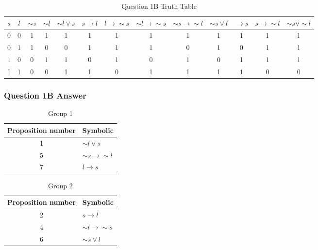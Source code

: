 \documentclass[12pt,a4paper]{article}
\begin{document}
\newpage
\begin{landscape}
\thispagestyle{fancylscape}
\begin{table}[h]
\centering
\caption{Question 1B Truth Table}
\begin{tabular}{c|c|c|c|c|c|c|c|c|c|c|c|c}
$s$ & $l$ & $\sim{s}$ & $\sim{l}$ & $\sim{l} \vee s$ & $s \rightarrow l$ & $l \rightarrow \sim{s}$ & $\sim{l} \rightarrow \sim{s}$ & $\sim{s} \rightarrow \sim{l}$ & $\sim{s} \vee l$ & $ \rightarrow s$ & $s \rightarrow \sim{l}$ & $\sim{s} \vee \sim{l}$ \\
\hline
0 & 0 & 1 & 1 & 1 & 1 & 1 & 1 & 1 & 1 & 1 & 1 & 1 \\
\hline
0 & 1 & 1 & 0 & 0 & 1 & 1 & 1 & 0 & 1 & 0 & 1 & 1 \\
\hline
1 & 0 & 0 & 1 & 1 & 0 & 1 & 0 & 1 & 0 & 1 & 1 & 1 \\
\hline
1 & 1 & 0 & 0 & 1 & 1 & 0 & 1 & 1 & 1 & 1 & 0 & 0 \\
\hline
\end{tabular}
\end{table}
\end{landscape}

\newpage
\subsubsection{Question 1B Answer}

\begin{table}[h]
\centering
\caption{Group 1}
\begin{tabular}{c|l}
Proposition number & Symbolic \\
\hline
1 & $\sim{l} \vee s$\\
\hline
5 & $\sim{s} \rightarrow \sim{l}$\\
\hline
7 & $l \rightarrow s$\\
\hline
\end{tabular}
\end{table}

\begin{table}[h]
\centering
\caption{Group 2}
\begin{tabular}{c|l}
Proposition number & Symbolic \\
\hline
2 & $s \rightarrow l$ \\
\hline
4 & $\sim{l} \rightarrow \sim{s}$ \\
\hline
6 & $\sim{s} \vee l$ \\
\end{tabular}
\end{table}
\end{document}
